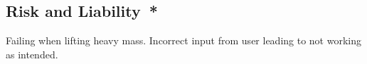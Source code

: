 
\subsection*{Risk and Liability{{\color{red}\ *}}}
Failing when lifting heavy mass.
Incorrect input from user leading to not working as intended.
